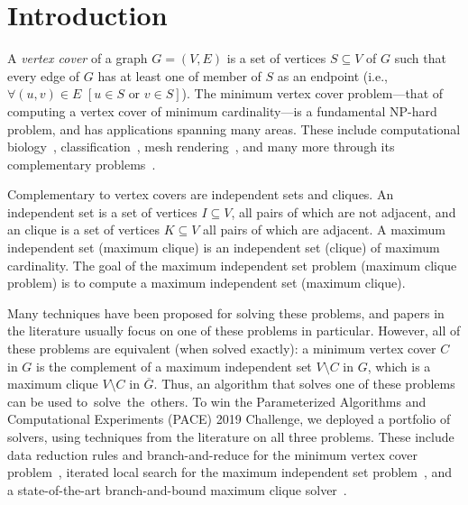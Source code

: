 \documentclass[twoside,leqno,twocolumn]{article}
\begin{document}
\section{Introduction}

A \emph{vertex cover} of a graph $G=(V,E)$ is a set of vertices $S\subseteq V$ of $G$ such that every edge of $G$ has at least one of member of $S$ as an endpoint (i.e., $\forall (u,v) \in E\,\, [u\in S \textrm{ or } v \in S]$).
The minimum vertex cover problem---that of computing a vertex cover of minimum cardinality---is a fundamental NP-hard problem, and has applications spanning many areas. These include computational biology~\cite{cheng2008prediction}, classification~\cite{gottlieb2014efficient}, mesh rendering~\cite{sander2008efficient}, and many more through its complementary problems~\cite{gnntbdmlisaac13,gardiner-docking-2000,harary-clique-1957,zaki-ecommerce-97}.

Complementary to vertex covers are independent sets and cliques. An independent set is a set of vertices $I\subseteq V$, all pairs of which are not adjacent, and an clique is a set of vertices $K\subseteq V$ all pairs of which are adjacent. A maximum independent set (maximum clique) is an independent set (clique) of maximum cardinality. The goal of the maximum independent set problem (maximum clique problem) is to compute a maximum independent set (maximum clique).

Many techniques have been proposed for solving these problems, and papers in the literature usually focus on one of these problems in particular. However, all of these problems are equivalent (when solved exactly): a
minimum vertex cover $C$ in $G$ is the complement of a maximum independent set $V\setminus C$ in $G$, which is a maximum clique $V\setminus C$ in $\overline{G}$. Thus, an algorithm that solves one of these problems can be used to~solve~the~others.
%
To win the Parameterized Algorithms and Computational Experiments (PACE) 2019 Challenge, we deployed a portfolio of solvers, using techniques from the literature on all three problems. These include data reduction rules and branch-and-reduce for the minimum vertex cover problem~\cite{akiba-tcs-2016}, iterated local search for the maximum independent set problem~\cite{andrade-2012}, and a state-of-the-art branch-and-bound maximum clique solver~\cite{DBLP:journals/cor/LiJM17}.
\end{document}
